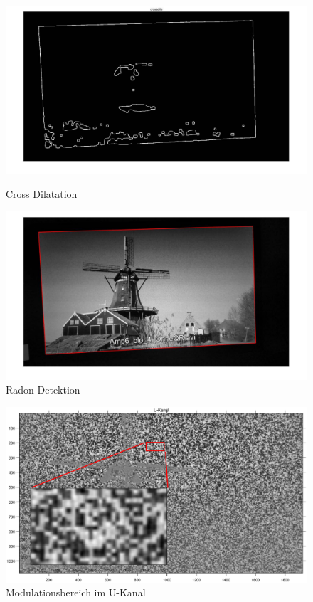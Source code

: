 \begin{figure}[H]
\centering 
\begin{minipage}[b]{0.49\textwidth} 
\centering 
\includegraphics[width=1.0\textwidth]{images/5_Implementirung/2/cd.pdf} 
\caption{Cross Dilatation}
\label{fig:cd}
\end{minipage}
\begin{minipage}[b]{0.49\textwidth} 
\centering 
\includegraphics[width=1.0\textwidth]{images/5_Implementirung/2/modulation.pdf}
\caption{Radon Detektion}
\label{fig:radon}
\end{minipage}
\end{figure}

\begin{figure}[H]
 \centering 
  \includegraphics[keepaspectratio,width=1.0\textwidth]{images/5_Implementirung/diff2.eps}
 \caption{Modulationsbereich im U-Kanal}
 \label{fig:Ergebnis1}
\end{figure}



